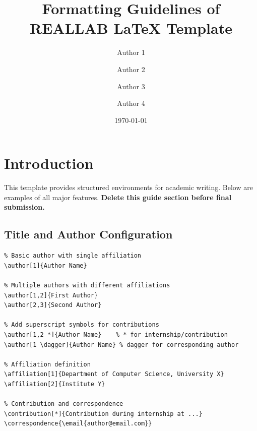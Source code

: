 \documentclass[]{fairmeta} %
\title{
Formatting Guidelines of REALLAB LaTeX Template
}
\author[1,2 *]{Author 1}
\author[2]{Author 2}
\author[3]{Author 3}
\author[1 \dagger]{Author 4}
\affiliation[1]{Affiliation 1}
\affiliation[2]{Affiliation 2}
\affiliation[3]{Affiliation 3}
\date{\today}
\theoremstyle{plain}
\theoremstyle{definition}
\theoremstyle{remark}
\begin{document}

\maketitle



\section{Introduction}
\label{sec:intro}


This template provides structured environments for academic writing.
Below are examples of all major features. \textbf{Delete this guide section before final submission.}


\subsection{Title and Author Configuration}
\label{sec:title}

\begin{verbatim}
% Basic author with single affiliation
\author[1]{Author Name}

% Multiple authors with different affiliations
\author[1,2]{First Author}
\author[2,3]{Second Author}

% Add superscript symbols for contributions
\author[1,2 *]{Author Name}    % * for internship/contribution
\author[1 \dagger]{Author Name} % dagger for corresponding author

% Affiliation definition
\affiliation[1]{Department of Computer Science, University X}
\affiliation[2]{Institute Y}

% Contribution and correspondence
\contribution[*]{Contribution during internship at ...}
\correspondence{\email{author@email.com}}
\end{verbatim}

\end{document}
